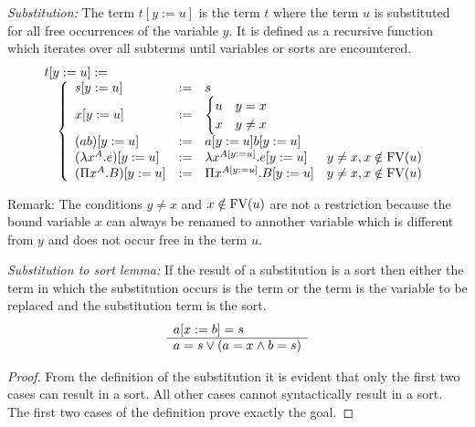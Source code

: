 \begin{definition}
    \emph{Substitution:}
    The term $t[y:=u]$ is the term $t$ where the term $u$ is substituted for all
    free occurrences of the variable $y$. It is defined as a recursive function
    which iterates over all subterms until variables or sorts are encountered.
    $$
    \begin{array}{l}
        t[y:=u] :=
        \\
        \quad\left\{ \begin{array}{llll} 
            s[y:=u] &:=& s
            \\
            x[y:=u] &:=&
                \begin{cases}
                    u & y = x
                    \\
                    x & y \ne x
                \end{cases}
            \\
            (a b)[y:=u] &:=& a[y:=u] b[y:=u]
            \\
            (\lambda x^A . e)[y:=u]
            &:=&
            \lambda x^{A[y:=u]}.e[y:=u]
            & y \ne x, x \notin \text{FV}(u)
            \\
            (\Pi x^A . B)[y:=u]
            &:=&
            \Pi x^{A[y:=u]}. B[y:=u]
            & y \ne x, x \notin \text{FV}(u)
         \end{array} \right.
    \end{array}
    $$
\end{definition}

Remark:
        The conditions $y \ne x$ and $x \notin \text{FV}(u)$ are not a restriction
        because the bound variable $x$ can always be renamed to annother
        variable which is different from $y$ and does not occur free in the term
        $u$.



\begin{lemma}
    \label{SubstitutionToSort}
    \emph{Substitution to sort lemma:}
    If the result of a substitution is a sort then either the term in
    which the substitution occurs is the term or the term is the variable to be
    replaced and the substitution term is the sort.
    $$
        \begin{array}{l} 
            a[x:=b] = s
         \\ \hline 
            a = s \lor (a = x \land b = s)
        \end{array}
    $$
    \begin{proof}
        From the definition of the substitution it is evident that only the
        first two cases can result in a sort. All other cases cannot
        syntactically result in a sort. The first two cases of the definition
        prove exactly the goal.
    \end{proof}
\end{lemma}



